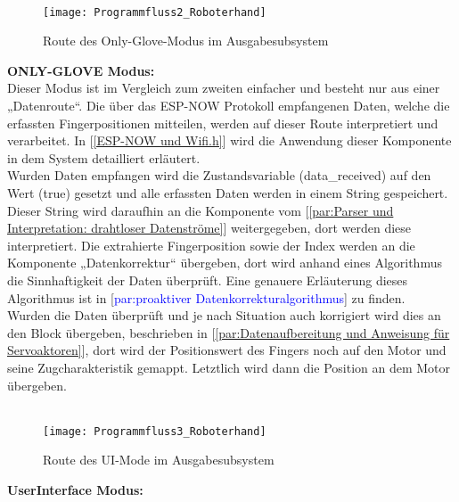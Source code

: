 \documentclass[titlepage,12pt,twoside]{article}
\begin{document}
\\
\begin{figure}[H]
	\begin{center}
		\scalebox{0.7}
		{\texttt{[image: Programmfluss2\_Roboterhand]}}
		\caption{Route des Only-Glove-Modus im Ausgabesubsystem}
		\label{fig:Programmfluss2_Roboterhand}		
	\end{center}
\end{figure}
\hfill \break
\textbf{ONLY-GLOVE Modus:} \\
Dieser Modus ist im Vergleich zum zweiten einfacher und besteht nur aus einer „Datenroute“. Die über das ESP-NOW Protokoll empfangenen Daten, welche 
die erfassten Fingerpositionen mitteilen, werden auf dieser Route interpretiert und verarbeitet. In [\textcolor{blue}{\autoref{ESP-NOW und Wifi.h}}] wird 
die Anwendung dieser Komponente in dem System detailliert erläutert. \\
Wurden Daten empfangen wird die Zustandsvariable (data\_received) auf den Wert (true) gesetzt und alle erfassten Daten werden in einem String gespeichert. 
Dieser String wird daraufhin an die Komponente  vom [\textcolor{blue}{\autoref{par:Parser und Interpretation: drahtloser Datenströme}}] weitergegeben, 
dort werden diese interpretiert. Die extrahierte Fingerposition sowie der Index werden an die Komponente „Datenkorrektur“ übergeben, dort wird anhand 
eines Algorithmus die Sinnhaftigkeit der Daten überprüft. Eine genauere Erläuterung dieses Algorithmus ist in [\textcolor{blue}{par:proaktiver Datenkorrekturalgorithmus}]
zu finden. \\
Wurden die Daten überprüft und je nach Situation auch korrigiert wird dies an den Block  übergeben, beschrieben in 
[\textcolor{blue}{\autoref{par:Datenaufbereitung und Anweisung für Servoaktoren}}], dort wird der Positionswert des Fingers noch auf den Motor und seine Zugcharakteristik 
gemappt. Letztlich wird dann die Position an dem Motor übergeben. \\
\\
\begin{figure}[H]
	\begin{center}
		\scalebox{0.7}
		{\texttt{[image: Programmfluss3\_Roboterhand]}}
		\caption{Route des UI-Mode im Ausgabesubsystem}
		\label{fig:Programmfluss3_Roboterhand}		
	\end{center}
\end{figure}
\hfill \break
\textbf{UserInterface Modus:} \\
\end{document}
